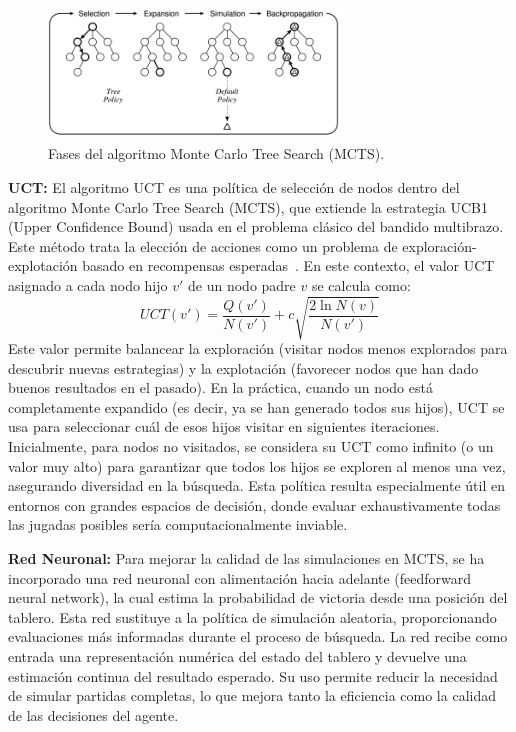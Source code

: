 \documentclass[conference,a4paper]{IEEEtran}
\begin{document}
\begin{figure}[H]
    \centering
    \includegraphics[width=0.7\textwidth]{mcts.png}
    \caption{Fases del algoritmo Monte Carlo Tree Search (MCTS).}
    \label{fig:grafico_entrenamiento}
\end{figure}


\textbf{UCT:} El algoritmo UCT es una política de selección de nodos dentro del algoritmo Monte Carlo Tree Search (MCTS), que extiende la estrategia UCB1 (Upper Confidence Bound) usada en el problema clásico del bandido multibrazo. Este método trata la elección de acciones como un problema de exploración-explotación basado en recompensas esperadas~\cite{b1}. En este contexto, el valor UCT asignado a cada nodo hijo \(v'\) de un nodo padre \(v\) se calcula como:
\[
    UCT(v') = \frac{Q(v')}{N(v')} + c \sqrt{\frac{2 \ln N(v)}{N(v')}}
\]
Este valor permite balancear la exploración (visitar nodos menos explorados para descubrir nuevas estrategias) y la explotación (favorecer nodos que han dado buenos resultados en el pasado). En la práctica, cuando un nodo está completamente expandido (es decir, ya se han generado todos sus hijos), UCT se usa para seleccionar cuál de esos hijos visitar en siguientes iteraciones. Inicialmente, para nodos no visitados, se considera su UCT como infinito (o un valor muy alto) para garantizar que todos los hijos se exploren al menos una vez, asegurando diversidad en la búsqueda. Esta política resulta especialmente útil en entornos con grandes espacios de decisión, donde evaluar exhaustivamente todas las jugadas posibles sería computacionalmente inviable.

\textbf{Red Neuronal:} Para mejorar la calidad de las simulaciones en MCTS, se ha incorporado una red neuronal con alimentación hacia adelante (feedforward neural network), la cual estima la probabilidad de victoria desde una posición del tablero. Esta red sustituye a la política de simulación aleatoria, proporcionando evaluaciones más informadas durante el proceso de búsqueda. La red recibe como entrada una representación numérica del estado del tablero y devuelve una estimación continua del resultado esperado. Su uso permite reducir la necesidad de simular partidas completas, lo que mejora tanto la eficiencia como la calidad de las decisiones del agente.
\end{document}
